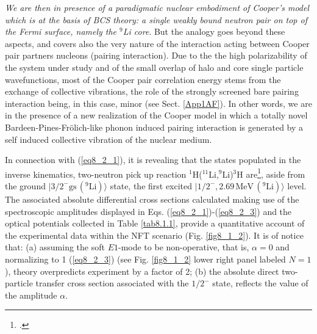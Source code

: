 \textit{We are then in presence of a paradigmatic nuclear embodiment of Cooper's model which is at the basis of BCS theory: a single weakly bound neutron pair on top of the Fermi surface, namely the  ${}^9$Li core}. But the analogy goes beyond these aspects, and covers also the very nature of the interaction acting between Cooper pair partners nucleons (pairing interaction). Due to the  the high polarizability of the system under study and of the small overlap of halo and core single particle wavefunctions, most of the Cooper pair correlation energy stems from the exchange of collective vibrations, the role of the strongly screened bare pairing interaction being, in this case, minor  (see Sect. \ref{App1AF}). In other words, we are in the presence of a new realization of the Cooper model in which a totally novel Bardeen-Pines-Fr\"olich-like phonon induced pairing interaction is generated by a self induced collective vibration of the nuclear medium.



 In connection with  (\ref{eq8_2_1}), it is revealing that the  states populated in the  inverse kinematics, two-neutron pick up reaction $^1$H($^{11}$Li,$^9$Li)$^3$H are\footnote{\cite{Tanihata:08}.}, aside from the ground $|3/2^-\text{gs}\,(^9\text{Li})\rangle$ state,  the first excited $|1/2^-,2.69\,\text{MeV}\,(^9\text{Li})\rangle$ level. The associated absolute differential cross sections calculated making use of the spectroscopic amplitudes displayed in Eqs. (\ref{eq8_2_1})-(\ref{eq8_2_3}) and the optical potentials collected in Table \ref{tab8.1.1}, provide a quantitative account of the experimental data  within the NFT scenario (Fig. \ref{fig8_1_2}). It is of notice that: (a) assuming the soft $E1$-mode to be non-operative, that is, $\alpha=0$ and normalizing to 1 (\ref{eq8_2_3}) (see Fig. \ref{fig8_1_2} lower right panel labeled $N=1$), theory overpredicts experiment by a factor of 2; (b) the absolute direct two-particle transfer cross section associated with the $1/2^-$ state, reflects the value of the amplitude $\alpha$. 
 
 
 
 
 
